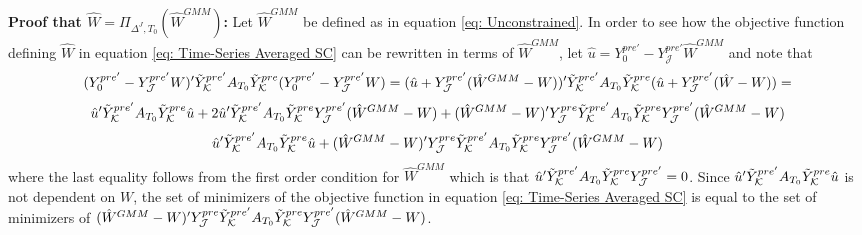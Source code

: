 \documentclass{article}
\begin{document}
\textbf{Proof that $\hat{W} = \Pi_{\Delta^J,T_0}(\hat{W}^{GMM})$:} Let $\hat{W}^{GMM}$ be defined as in equation \eqref{eq: Unconstrained}. In order to see how the objective function defining $\hat{W}$ in equation \eqref{eq: Time-Series Averaged SC} can be rewritten in terms of $\hat{W}^{GMM}$, let $\hat{u} = Y_{0}^{pre'} - Y_{\mathcal{J}}^{pre'} \hat{W}^{GMM}$ and note that 
\begin{equation*}
    (Y_{0}^{pre'} - Y_{\mathcal{J}}^{pre'} W)'\Tilde{Y}_{\mathcal{K}}^{pre'} A_{T_0} \Tilde{Y}_{\mathcal{K}}^{pre} (Y_{0}^{pre'} - Y_{\mathcal{J}}^{pre'} W) = (\hat{u} + Y_{\mathcal{J}}^{pre'}(\hat{W}^{GMM} - W))' \Tilde{Y}_{\mathcal{K}}^{pre'} A_{T_0} \Tilde{Y}_{\mathcal{K}}^{pre} (\hat{u} + Y_{\mathcal{J}}^{pre'} (\hat{W} - W)) = 
\end{equation*}
\begin{equation*}
    \hat{u}' \Tilde{Y}_{\mathcal{K}}^{pre'} A_{T_0} \Tilde{Y}_{\mathcal{K}}^{pre} \hat{u} + 2\hat{u}' \Tilde{Y}_{\mathcal{K}}^{pre'} A_{T_0} \Tilde{Y}_{\mathcal{K}}^{pre} Y_{\mathcal{J}}^{pre'} (\hat{W}^{GMM} - W) + (\hat{W}^{GMM} - W)' Y_{\mathcal{J}}^{pre} \Tilde{Y}_{\mathcal{K}}^{pre'} A_{T_0} \Tilde{Y}_{\mathcal{K}}^{pre} Y_{\mathcal{J}}^{pre'} (\hat{W}^{GMM} - W)
\end{equation*}
\begin{equation*}
    \hat{u}' \Tilde{Y}_{\mathcal{K}}^{pre'} A_{T_0} \Tilde{Y}_{\mathcal{K}}^{pre} \hat{u} + (\hat{W}^{GMM} - W)' Y_{\mathcal{J}}^{pre} \Tilde{Y}_{\mathcal{K}}^{pre'} A_{T_0} \Tilde{Y}_{\mathcal{K}}^{pre} Y_{\mathcal{J}}^{pre'} (\hat{W}^{GMM} - W)
\end{equation*}
where the last equality follows from the first order condition for $\hat{W}^{GMM}$ which is that $\hat{u}' \Tilde{Y}_{\mathcal{K}}^{pre'} A_{T_0} \Tilde{Y}_{\mathcal{K}}^{pre} Y_{\mathcal{J}}^{pre'} = 0$. Since $\hat{u}' \Tilde{Y}_{\mathcal{K}}^{pre'} A_{T_0} \Tilde{Y}_{\mathcal{K}}^{pre} \hat{u}$ is not dependent on $W$, the set of minimizers of the objective function in equation \eqref{eq: Time-Series Averaged SC} is equal to the set of minimizers of $(\hat{W}^{GMM} - W)' Y_{\mathcal{J}}^{pre} \Tilde{Y}_{\mathcal{K}}^{pre'} A_{T_0} \Tilde{Y}_{\mathcal{K}}^{pre} Y_{\mathcal{J}}^{pre'} (\hat{W}^{GMM} - W)$.
\end{document}
